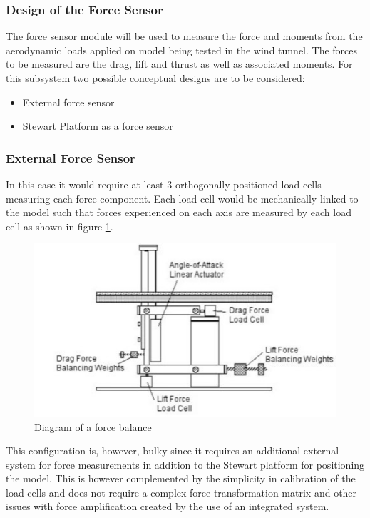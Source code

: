 \subsubsection{Design of the Force Sensor}
The force sensor module will be used to measure the force and moments from the aerodynamic loads applied on model being tested in the wind tunnel. The forces to be measured are the drag, lift and thrust as well as associated moments. For this subsystem two possible conceptual designs are to be considered:
\begin{itemize}
\item External force sensor
\item Stewart Platform as a force sensor
\end{itemize}
\subsubsection*{External Force Sensor}
In this case it would require at least 3 orthogonally positioned load cells measuring each force component. Each load cell would be mechanically linked to the model such that forces experienced on each axis are measured by each load cell as shown in figure \ref{fig:balex}. 
\begin{center}
	\begin{figure}[H]
		\centering
		\includegraphics{Figures/modBal}
		\caption[Diagram of a force balance]{Diagram of a force balance \cite{post_force_2010}}
		\label{fig:balex}
	\end{figure}
\end{center}
This configuration is, however, bulky since it requires an additional external system for force measurements in addition to the Stewart platform for positioning the model. This is however complemented by the simplicity in calibration of the load cells and does not require a complex force transformation matrix and other issues with force amplification created by the use of an integrated system.
